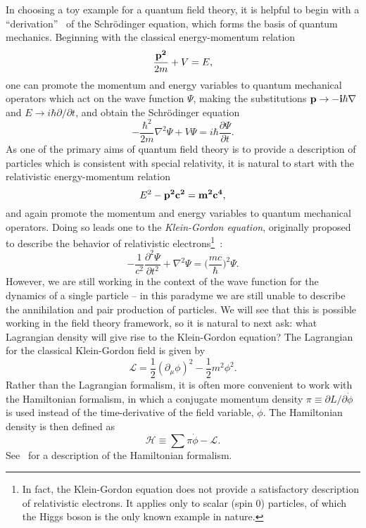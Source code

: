 In choosing a toy example for a quantum field theory, it is helpful to begin with a ``derivation''~\cite{Griffiths:2008zz} of the Schr{\"o}dinger equation, which forms the basis of quantum mechanics.
Beginning with the classical energy-momentum relation
\begin{equation}
    \frac{\bf{p}^2}{2m} + V = E,
\end{equation}
one can promote the momentum and energy variables to quantum mechanical operators which act on the wave function $\Psi$, making the substitutions $\bf{p} \to -i\hbar\nabla$ and $E \to i\hbar \partial/\partial t$, and obtain the Schr{\"o}dinger equation
\begin{equation}
    - \frac{\hbar^2}{2m} \nabla^2 \Psi + V \Psi = i\hbar \frac{\partial \Psi}{\partial t}.
\end{equation}
As one of the primary aims of quantum field theory is to provide a description of particles which is consistent with special relativity, it is natural to start with the relativistic energy-momentum relation
\begin{equation}
    E^2 - \bf{p}^2c^2 = m^2 c^4,
\end{equation}
and again promote the momentum and energy variables to quantum mechanical operators.
Doing so leads one to the \emph{Klein-Gordon equation}, originally proposed to describe the behavior of relativistic electrons\footnote{In fact, the Klein-Gordon equation does not provide a satisfactory description of relativistic electrons. It applies only to scalar (spin 0) particles, of which the Higgs boson is the only known example in nature.}~\cite{Klein:kge,Gordon:kge}:
\begin{equation}
    -\frac{1}{c^2} \frac{\partial^2 \Psi}{\partial t^2} + \nabla^2 \Psi = \bigg(\frac{mc}{\hbar}\bigg)^2 \Psi.
\end{equation}
However, we are still working in the context of the wave function for the dynamics of a single particle -- in this paradyme we are still unable to describe the annihilation and pair production of particles.
We will see that this is possible working in the field theory framework, so it is natural to next ask: what Lagrangian density will give rise to the Klein-Gordon equation?
The Lagrangian for the classical Klein-Gordon field is given by
\begin{equation} \label{eqn:classical_kg}
    \mathcal L = \frac{1}{2} (\partial_\mu \phi)^2 - \frac{1}{2} m^2 \phi^2.
\end{equation}
Rather than the Lagrangian formalism, it is often more convenient to work with the Hamiltonian formalism, in which a conjugate momentum density $\pi \equiv \partial L/\partial \dot{\phi}$ is used instead of the time-derivative of the field variable, $\dot{\phi}$.
The Hamiltonian density is then defined as
\begin{equation}
    \mathcal H \equiv \sum \pi \dot{\phi} - \mathcal L.
\end{equation}
See~\cite{Fetter:cm} for a description of the Hamiltonian formalism. 

